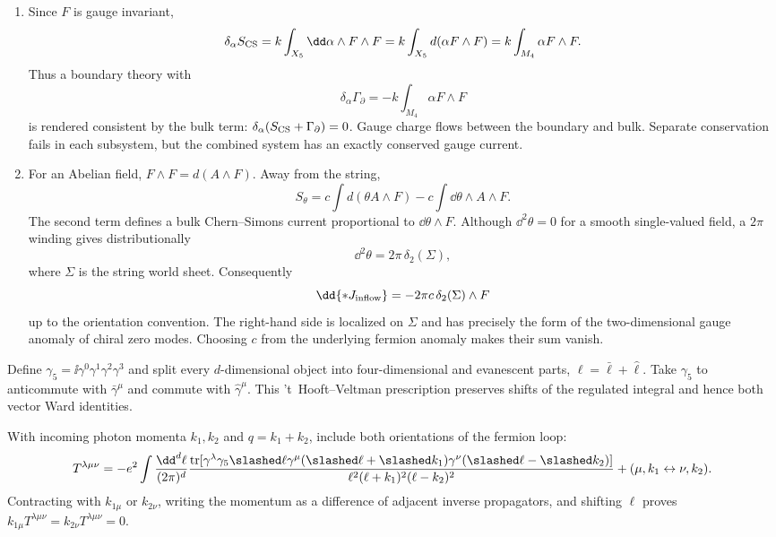 \begin{enumerate}
  \begin{enumerate}
    \item[(a)]
    Since \(F\) is gauge invariant,
    \[
      \delta_\alpha S_{\rm CS}
        =k\int_{X_5}\dd\alpha\wedge F\wedge F
        =k\int_{X_5}d(\alpha F\wedge F)
        =k\int_{M_4}\alpha F\wedge F.
    \]
    Thus a boundary theory with
    \[
      \delta_\alpha\Gamma_{\partial}
        =-k\int_{M_4}\alpha F\wedge F
    \]
    is rendered consistent by the bulk term:
    \(\delta_\alpha(S_{\rm CS}+\Gamma_\partial)=0\).
    Gauge charge flows between the boundary and bulk.  Separate
    conservation fails in each subsystem, but the combined system has an
    exactly conserved gauge current.
    \item[(b)]
    For an Abelian field,
    \(F\wedge F=d(A\wedge F)\).  Away from the string,
    \[
      S_\theta
        =c\int d(\theta A\wedge F)
         -c\int \dd\theta\wedge A\wedge F.
    \]
    The second term defines a bulk Chern--Simons current proportional to
    \(\dd\theta\wedge F\).  Although \(\dd^2\theta=0\) for a smooth
    single-valued field, a \(2\pi\) winding gives distributionally
    \[
      \dd^2\theta=2\pi\,\delta_2(\Sigma),
    \]
    where \(\Sigma\) is the string world sheet.  Consequently
    \[
      \dd{*J_{\rm inflow}}
        =-2\pi c\,\delta_2(\Sigma)\wedge F
    \]
    up to the orientation convention.  The right-hand side is localized
    on \(\Sigma\) and has precisely the form of the two-dimensional gauge
    anomaly of chiral zero modes.  Choosing \(c\) from the underlying
    fermion anomaly makes their sum vanish.
  \end{enumerate}

  Define \(\gamma_5=\ii\gamma^0\gamma^1\gamma^2\gamma^3\) and split every
  \(d\)-dimensional object into four-dimensional and evanescent parts,
  \(\ell=\bar\ell+\widehat\ell\).  Take \(\gamma_5\) to anticommute with
  \(\bar\gamma^\mu\) and commute with \(\widehat\gamma^\mu\).  This
  't~Hooft--Veltman prescription preserves shifts of the regulated
  integral and hence both vector Ward identities.

  With incoming photon momenta \(k_1,k_2\) and
  \(q=k_1+k_2\), include both orientations of the fermion loop:
  \[
    T^{\lambda\mu\nu}
      =-e^2\int\frac{\dd^d\ell}{(2\pi)^d}
      \frac{\operatorname{tr}[
       \gamma^\lambda\gamma_5\slashed\ell\gamma^\mu
       (\slashed\ell+\slashed k_1)\gamma^\nu
       (\slashed\ell-\slashed k_2)]}
      {\ell^2(\ell+k_1)^2(\ell-k_2)^2}
      +(\mu,k_1\leftrightarrow\nu,k_2).
  \]
  Contracting with \(k_{1\mu}\) or \(k_{2\nu}\), writing the momentum as a
  difference of adjacent inverse propagators, and shifting \(\ell\)
  proves \(k_{1\mu}T^{\lambda\mu\nu}
  =k_{2\nu}T^{\lambda\mu\nu}=0\).


\end{enumerate}
